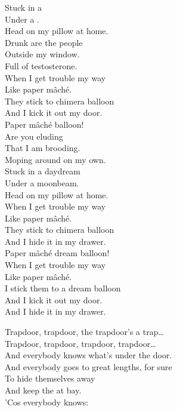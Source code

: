 Stuck in a  \\
Under a . \\
Head on my pillow at home. \\
Drunk are the people \\
Outside my window. \\
Full of testosterone. \\

When I get trouble my way \\
Like paper mâché. \\
They stick to chimera balloon \\
And I kick it out my door. \\

Paper mâché  balloon! \\

Are you eluding \\
That I am brooding. \\
Moping around on my own. \\
Stuck in a daydream \\
Under a moonbeam. \\
Head on my pillow at home. \\

When I get trouble my way \\
Like paper mâché. \\
They stick to chimera balloon \\
And I hide it in my drawer. \\

Paper mâché dream balloon! \\

When I get trouble my way \\
Like paper mâché. \\
I stick them to a dream balloon \\
And I kick it out my door. \\
And I hide it in my drawer. \\




Trapdoor, trapdoor, the trapdoor's a trap… \\
Trapdoor, trapdoor, trapdoor, trapdoor… \\

And everybody knows what's under the door. \\
And everybody goes to great lengths, for sure \\
To hide themselves away \\
And keep the  at bay. \\
'Cos everybody knows: \\


